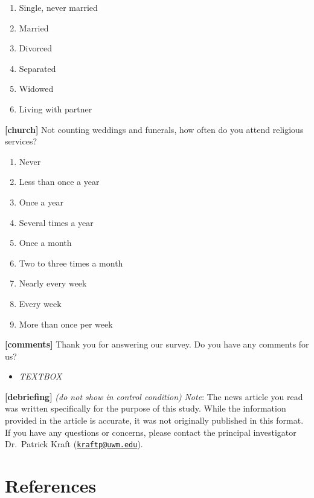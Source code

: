 \documentclass[
]{article}
\providecommand{\tightlist}{%
  \setlength{\itemsep}{0pt}\setlength{\parskip}{0pt}}
\begin{document}
\begin{enumerate}
\def\labelenumi{\arabic{enumi}.}
\tightlist
\item
  Single, never married
\item
  Married
\item
  Divorced
\item
  Separated
\item
  Widowed
\item
  Living with partner
\end{enumerate}

\textbf{{[}church{]}} Not counting weddings and funerals, how often do
you attend religious services?

\begin{enumerate}
\def\labelenumi{\arabic{enumi}.}
\tightlist
\item
  Never
\item
  Less than once a year
\item
  Once a year
\item
  Several times a year
\item
  Once a month
\item
  Two to three times a month
\item
  Nearly every week
\item
  Every week
\item
  More than once per week
\end{enumerate}

\textbf{{[}comments{]}} Thank you for answering our survey. Do you have
any comments for us?

\begin{itemize}
\tightlist
\item
  \emph{TEXTBOX}
\end{itemize}

\textbf{{[}debriefing{]}} \emph{(do not show in control condition)}
\emph{Note}: The news article you read was written specifically for the
purpose of this study. While the information provided in the article is
accurate, it was not originally published in this format. If you have
any questions or concerns, please contact the principal investigator
Dr.~Patrick Kraft
(\href{mailto:kraftp@uwm.edu}{\nolinkurl{kraftp@uwm.edu}}).

\hypertarget{references}{%
\section{References}\label{references}}
\end{document}
